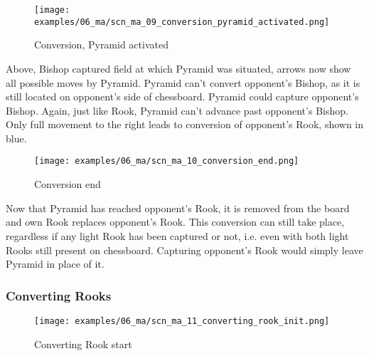 \clearpage %

\noindent
\begin{figure}[!h]
\texttt{[image: examples/06\_ma/scn\_ma\_09\_conversion\_pyramid\_activated.png]}
\caption{Conversion, Pyramid activated}
\label{fig:scn_ma_09_conversion_pyramid_activated}
\end{figure}

Above, Bishop captured field at which Pyramid was situated, arrows now show all
possible moves by Pyramid. Pyramid can't convert opponent's Bishop, as it is still
located on opponent's side of chessboard. Pyramid could capture opponent's Bishop.
Again, just like Rook, Pyramid can't advance past opponent's Bishop. Only full
movement to the right leads to conversion of opponent's Rook, shown in blue.

\clearpage %

\noindent
\begin{figure}[!h]
\texttt{[image: examples/06\_ma/scn\_ma\_10\_conversion\_end.png]}
\caption{Conversion end}
\label{fig:scn_ma_10_conversion_end}
\end{figure}

Now that Pyramid has reached opponent's Rook, it is removed from the board and
own Rook replaces opponent's Rook. This conversion can still take place, regardless
if any light Rook has been captured or not, i.e. even with both light Rooks still
present on chessboard. Capturing opponent's Rook would simply leave Pyramid in
place of it.

\clearpage %

\subsubsection*{Converting Rooks}
\label{sec:Mayan Ascendancy/Pyramid/Conversion/Converting Rooks}

\vspace*{-1.1\baselineskip}
\noindent
\begin{figure}[!h]
\texttt{[image: examples/06\_ma/scn\_ma\_11\_converting\_rook\_init.png]}
\caption{Converting Rook start}
\label{fig:scn_ma_11_converting_rook_init}
\end{figure}

